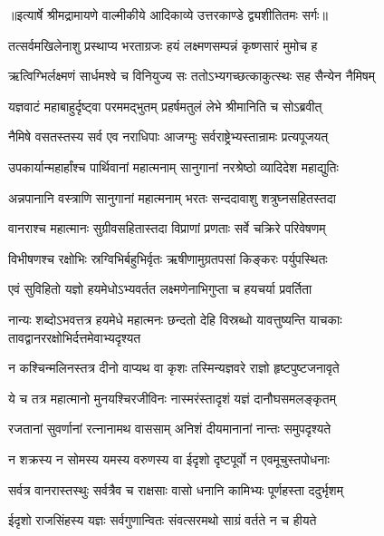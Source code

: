 {॥इत्यार्षे श्रीमद्रामायणे वाल्मीकीये आदिकाव्ये उत्तरकाण्डे द्व्यशीतितमः सर्गः॥}


\twolineshloka
{तत्सर्वमखिलेनाशु प्रस्थाप्य भरताग्रजः}
{हयं लक्ष्मणसम्पन्नं कृष्णसारं मुमोच ह} %

\twolineshloka
{ऋत्विग्भिर्लक्ष्मणं सार्धमश्वे च विनियुज्य सः}
{ततोऽभ्यगच्छत्काकुत्स्थः सह सैन्येन नैमिषम्} %

\twolineshloka
{यज्ञवाटं महाबाहुर्दृष्ट्वा परममद्भुतम्}
{प्रहर्षमतुलं लेभे श्रीमानिति च सोऽब्रवीत्} %

\twolineshloka
{नैमिषे वसतस्तस्य सर्व एव नराधिपाः}
{आजग्मुः सर्वराष्ट्रेभ्यस्तान्रामः प्रत्यपूजयत्} %

\twolineshloka
{उपकार्यान्महार्हांश्च पार्थिवानां महात्मनाम्}
{सानुगानां नरश्रेष्ठो व्यादिदेश महाद्युतिः} %

\twolineshloka
{अन्नपानानि वस्त्राणि सानुगानां महात्मनाम्}
{भरतः सन्ददावाशु शत्रुघ्नसहितस्तदा} %

\twolineshloka
{वानराश्च महात्मानः सुग्रीवसहितास्तदा}
{विप्राणां प्रणताः सर्वे चक्रिरे परिवेषणम्} %

\twolineshloka
{विभीषणश्च रक्षोभिः स्रग्विभिर्बहुभिर्वृतः}
{ऋषीणामुग्रतपसां किङ्करः पर्युपस्थितः} %

\twolineshloka
{एवं सुविहितो यज्ञो हयमेधोऽभ्यवर्तत}
{लक्ष्मणेनाभिगुप्ता च हयचर्या प्रवर्तिता} %

\threelineshloka
{नान्यः शब्दोऽभवत्तत्र हयमेधे महात्मनः}
{छन्दतो देहि विस्रब्धो यावत्तुष्यन्ति याचकाः}
{तावद्वानररक्षोभिर्दत्तमेवाभ्यदृश्यत} %

\twolineshloka
{न कश्चिन्मलिनस्तत्र दीनो वाप्यथ वा कृशः}
{तस्मिन्यज्ञवरे राज्ञो हृष्टपुष्टजनावृते} %

\twolineshloka
{ये च तत्र महात्मानो मुनयश्चिरजीविनः}
{नास्मरंस्तादृशं यज्ञं दानौघसमलङ्कृतम्} %

\twolineshloka
{रजतानां सुवर्णानां रत्नानामथ वाससाम्}
{अनिशं दीयमानानां नान्तः समुपदृश्यते} %

\twolineshloka
{न शक्रस्य न सोमस्य यमस्य वरुणस्य वा}
{ईदृशो दृष्टपूर्वो न एवमूचुस्तपोधनाः} %

\twolineshloka
{सर्वत्र वानरास्तस्थुः सर्वत्रैव च राक्षसाः}
{वासो धनानि कामिभ्यः पूर्णहस्ता ददुर्भृशम्} %

\twolineshloka
{ईदृशो राजसिंहस्य यज्ञः सर्वगुणान्वितः}
{संवत्सरमथो साग्रं वर्तते न च हीयते} %


